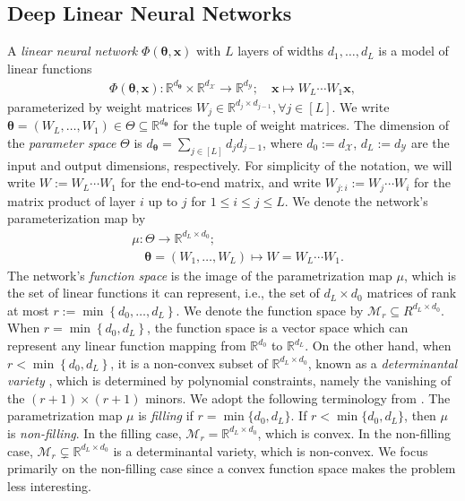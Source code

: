 \documentclass{article}
\theoremstyle{plain}
\theoremstyle{definition}
\theoremstyle{remark}
\theoremstyle{remark}
\begin{document}
\subsection{Deep Linear Neural Networks}
A \textit{linear neural network} $\Phi(\boldsymbol{\theta}, \mathbf{x})$ with $L$ layers of widths $d_1, \ldots, d_L$
is a model of linear functions
\begin{align}
  \Phi(\boldsymbol{\theta}, \mathbf{x}): \mathbb{R}^{d_{\boldsymbol{\theta}}} \times \mathbb{R}^{d_{\mathcal{X}}} \rightarrow \mathbb{R}^{d_{\mathcal{Y}}}; \quad \mathbf{x} \mapsto W_L \cdots W_1 \mathbf{x},
\end{align}
parameterized by weight matrices $W_j \in \mathbb{R}^{d_j \times d_{j-1}}, \forall j \in [L]$. We write $\boldsymbol{\theta} = (W_L, \dots, W_1) \in \Theta\subseteq \mathbb{R}^{d_{\boldsymbol{\theta}}}$ for the tuple of weight matrices. 
The dimension of the \textit{parameter space} $\Theta$ is $d_{\boldsymbol{\theta}} = \sum_{j\in [L]} d_j d_{j-1}$, where $d_0 := d_{\mathcal{X}}$, $d_L := d_{\mathcal{Y}}$ are the input and output dimensions, respectively. 
For simplicity of the notation, we will write $W:=W_L \cdots W_1$ for the end-to-end matrix, and write $W_{j: i}:=W_j \cdots W_i$ for the matrix product of layer $i$ up to $j$ for $1 \leqslant i \leqslant j \leqslant L$. 
We denote the network's parameterization map by
\begin{align}
  &\mu: \Theta \rightarrow \mathbb{R}^{d_L \times d_0} ; \nonumber \\
  &\quad \boldsymbol{\theta}=\left(W_1, \ldots, W_L\right) \mapsto W=W_L \cdots W_1.
\end{align}
The network's \textit{function space} is the image of the parametrization map $\mu$, which is the set of linear functions it can represent, i.e., the set of $d_L \times d_0$ matrices of rank at most $r := \min \left\{d_0, \dots, d_L\right\}$. 
We denote the function space by $\mathcal{M}_r \subseteq R^{d_L \times d_0}$. When $r=\min \left\{d_0, d_L\right\}$, the function space is a vector space which can represent any linear function mapping from $\mathbb{R}^{d_0}$ to $\mathbb{R}^{d_L}$. 
On the other hand, when $r<\min \left\{d_0, d_L\right\}$, it is a non-convex subset of $\mathbb{R}^{d_L \times d_0}$, known as a \textit{determinantal variety} \citep[see][Chapter 9]{Harris1992}, which is determined by polynomial constraints, namely the vanishing of the $(r+1) \times(r+1)$ minors. 
We adopt the following terminology from \citet{Trager2020Pure}. The parametrization map $\mu$ is \textit{filling} if $r = \min\{d_0, d_L\}$. If $r < \min\{d_0, d_L\}$, then $\mu$ is \textit{non-filling}. In the filling case, $\mathcal{M}_r = \mathbb{R}^{d_L \times d_0}$, which is convex. In the non-filling case, $\mathcal{M}_r \subsetneq \mathbb{R}^{d_L \times d_0}$ is a determinantal variety, which is non-convex. We focus primarily on the non-filling case since a convex function space makes the problem less interesting.
\end{document}

